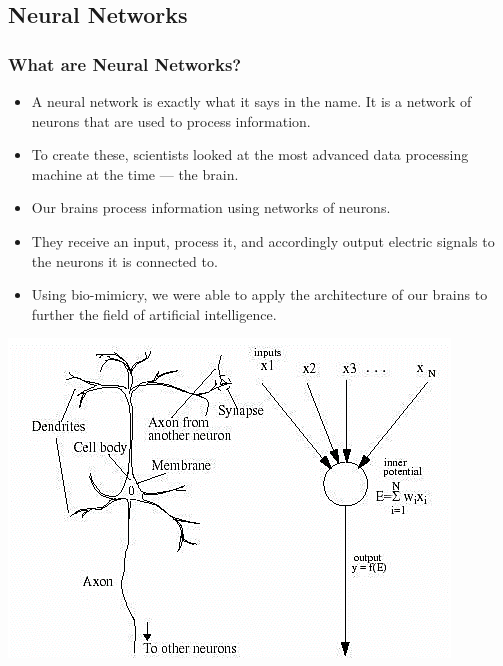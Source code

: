 \documentclass{beamer}
\begin{document}

\subsection{Neural Networks}
\begin{frame}
\frametitle{What are Neural Networks?}
\begin{itemize}
   \item A neural network is exactly what it says in the name. It is a network of neurons that are used to process information. 
   \item To create these, scientists looked at the most advanced data processing machine at the time — the brain.
   \item Our brains process information using networks of neurons.
   \item   They receive an input, process it, and accordingly output electric signals to the neurons it is connected to. \item Using bio-mimicry, we were able to apply the architecture of our brains to further the field of artificial intelligence.
   
\end{itemize}
\centering
\includegraphics[scale=0.3]{ann.png}
\end{frame}

\end{document}
